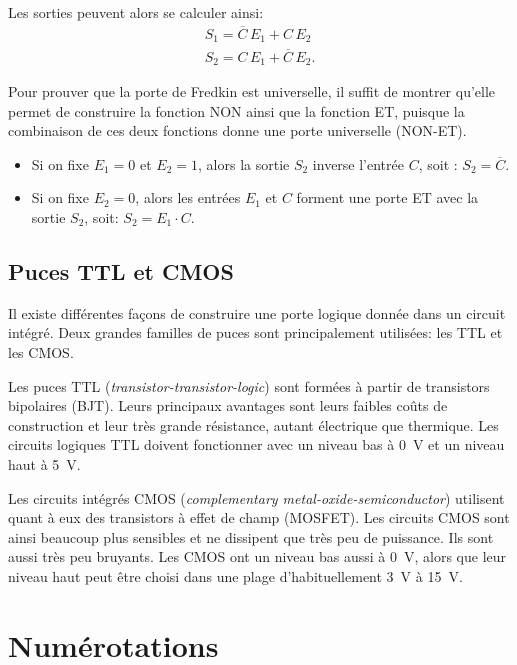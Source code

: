 \documentclass[canadien,12pt,oneside,letterpaper]{article}
\begin{document}
Les sorties peuvent alors se calculer ainsi:
\begin{subequations}
\begin{gather}
S_1=\overline{C}\,E_1+C\,E_2\\
S_2=C\,E_1+\overline{C}\,E_2.
\end{gather}
\end{subequations}

Pour prouver que la porte de Fredkin est universelle, il suffit de montrer qu'elle permet de construire la fonction NON ainsi que la fonction ET, puisque la combinaison de ces deux fonctions donne une porte universelle (NON-ET).
\begin{itemize}
\item Si on fixe $E_1=0$ et $E_2=1$, alors la sortie $S_2$ inverse l'entrée $C$, soit : $S_2=\overline{C}$.
\item Si on fixe $E_2=0$, alors les entrées $E_1$ et $C$ forment une porte ET avec la sortie $S_2$, soit: $S_2=E_1\cdot C$.
\end{itemize}


\subsection{Puces TTL et CMOS}

Il existe différentes façons de construire une porte logique donnée dans un circuit intégré. Deux grandes familles de puces sont principalement utilisées: les TTL et les CMOS.

Les puces TTL (\textit{transistor-transistor-logic}) sont formées à partir de transistors bipolaires (BJT). Leurs principaux avantages sont leurs faibles coûts de construction et leur très grande résistance, autant électrique que thermique. Les circuits logiques TTL doivent fonctionner avec un niveau bas à 0~V et un niveau haut à 5~V.

Les circuits intégrés CMOS (\textit{complementary metal-oxide-semiconductor}) utilisent quant à eux des transistors à effet de champ (MOSFET). Les circuits CMOS sont ainsi beaucoup plus sensibles et ne dissipent que très peu de puissance. Ils sont aussi très peu bruyants. Les CMOS ont un niveau bas aussi à 0~V, alors que leur niveau haut peut être choisi dans une plage d'habituellement 3~V à 15~V.


\section{Numérotations}
\end{document}
